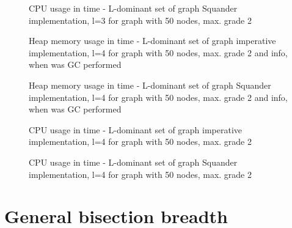 \documentclass[11pt,twoside,a4paper]{book}
\begin{document}
\begin{figure}[ht]
\begin{center}

\caption{CPU usage in time - L-dominant set of graph Squander
implementation, l=3 for graph with 50 nodes, max. grade 2}
\label{fig:ldsgSCpu5023}
\end{center}
\end{figure}




\begin{figure}
\begin{center}

\caption{Heap memory usage in time - L-dominant set of graph imperative
implementation, l=4 for graph with 50 nodes, max. grade 2 and info, when was GC
performed}
\label{fig:ldsgIMem5024}
\end{center}
\end{figure}





\begin{figure}
\begin{center}

\caption{Heap memory usage in time - L-dominant set of graph Squander
implementation, l=4 for graph with 50 nodes, max. grade 2 and info, when was GC
performed}
\label{fig:ldsgSMem5024}
\end{center}
\end{figure}


\begin{figure}
\begin{center}

\caption{CPU usage in time - L-dominant set of graph imperative
implementation, l=4 for graph with 50 nodes, max. grade 2}
\label{fig:ldsgICpu5024}
\end{center}
\end{figure}


\begin{figure}[ht]
\begin{center}

\caption{CPU usage in time - L-dominant set of graph Squander
implementation, l=4 for graph with 50 nodes, max. grade 2}
\label{fig:ldsgSCpu5024}
\end{center}
\end{figure}

\clearpage 

\section{General bisection breadth}
\end{document}
